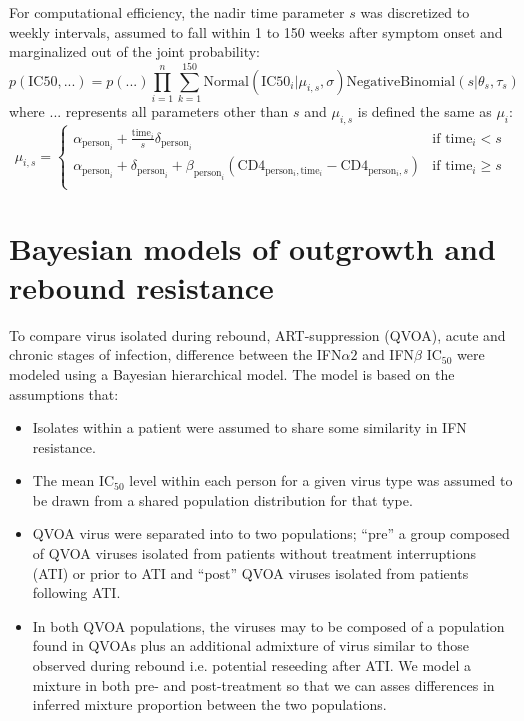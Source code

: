 \documentclass[12pt]{article}
\newcommand{\ifna}{IFN${\alpha 2}$}
\newcommand{\ifnb}{IFN${\beta}$}
\newcommand{\icFifty}{IC$_{50}$}
\begin{document}
For computational efficiency, the nadir time parameter $s$ was discretized to weekly intervals, assumed to fall within 1 to 150 weeks after symptom onset and marginalized out of the joint probability:
\[p(\text{IC50},\text{...})=p(\text{...})\prod_{i=1}^n\sum_{k=1}^{150}\text{Normal}(\text{IC50}_i|\mu_{i,s},\sigma)\text{NegativeBinomial}(s|\theta_s,\tau_s)\]
where $\text{...}$ represents all parameters other than $s$ and $\mu_{i,s}$ is defined the same as $\mu_i$:
\[\mu_{i,s}=\begin{cases}
    \alpha_{\text{person}_i}+\frac{\text{time}_i}{s}\delta_{\text{person}_i} & \text{if } \text{time}_i<s\\
    \alpha_{\text{person}_i}+\delta_{\text{person}_i} + \beta_{\text{person}_i}(\text{CD4}_{\text{person$_i$},\text{time}_i}-\text{CD4}_{\text{person$_i$},s}) & \text{if } \text{time}_i\ge s\\
  \end{cases}
\]


\section*{Bayesian models of outgrowth and rebound resistance}
  To compare virus isolated during rebound, ART-suppression (QVOA), acute and chronic stages of infection, difference between the \ifna{} and \ifnb{} \icFifty{} were modeled using a Bayesian hierarchical model. The model is based on the assumptions that:
  \begin{itemize}
    \item Isolates within a patient were assumed to share some similarity in IFN resistance.
    \item The mean \icFifty{} level within each person for a given virus type was assumed to be drawn from a shared population distribution for that type. 
    \item QVOA virus were separated into to two populations; ``pre'' a group composed of QVOA viruses isolated from patients without treatment interruptions (ATI) or prior to ATI and ``post'' QVOA viruses isolated from patients following ATI.
    \item In both QVOA populations, the viruses may to be composed of a population found in QVOAs plus an additional admixture of virus similar to those observed during rebound i.e. potential reseeding after ATI. We model a mixture in both pre- and post-treatment so that we can asses differences in inferred mixture proportion between the two populations.
  \end{itemize}
\end{document}
